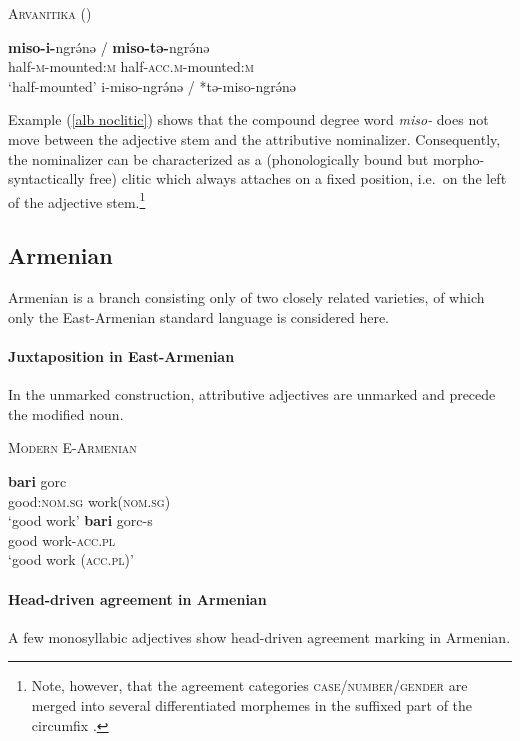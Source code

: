 \begin{exe}
\ex \textsc{Arvanitika} (\citealt[304]{sasse1991}) \label{alb noclitic}
\begin{xlist}
\ex
\gll	\textbf{miso-i-}ngrə́nə / \textbf{miso-tə-}ngrə́nə\\
	half-\textsc{m}-mounted:\textsc{m} { } half-\textsc{acc.m}-mounted:\textsc{m}\\
\glt	‘half-mounted’
\ex	*i-miso-ngrə́nə / *tə-miso-ngrə́nə
\end{xlist}
\end{exe}
Example (\ref{alb noclitic}) shows that the compound degree word {\it miso-} does not move between the adjective stem and the attributive nominalizer. Consequently, the nominalizer can be characterized as a (phonologically bound but morpho-syntactically free) clitic which always attaches on a fixed position, i.e.~on the left of the adjective stem.\footnote{Note, however, that the agreement categories \textsc{case/number/gender} are merged into several differentiated morphemes in the suffixed part of the circumfix \cite[124–128]{sasse1991}.}

\subsection{Armenian}
Armenian is a branch consisting only of two closely related varieties, of which only the East-Armenian standard language is considered here.

\paragraph{Juxtaposition in East-Armenian} 
In the unmarked construction, attributive adjectives are unmarked and precede the modified noun.
\begin{exe}
\ex \textsc{Modern E-Armenian} \citep{ajello1998}
\begin{xlist}
\ex 
\gll	\textbf{bari} gorc\\
	good:\textsc{nom.sg} work(\textsc{nom.sg})\\
\glt	‘good work’
\ex 
\gll	\textbf{bari} gorc-s\\
	good work-\textsc{acc.pl}\\
\glt	‘good work (\textsc{acc.pl})’
\end{xlist}
\end{exe}

\paragraph{Head-driven agreement in Armenian}
A few monosyllabic adjectives show head-driven agreement marking in Armenian. 

